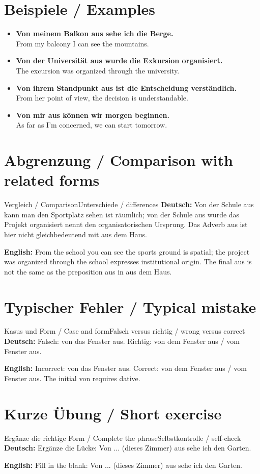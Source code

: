\documentclass[a4paper,11pt]{article}
\newcommand{\GermanText}[1]{\textbf{Deutsch: }#1\par}
\newcommand{\EnglishText}[1]{{\small\color{SoftGray}\textbf{English: }#1\par}}
\newcommand{\ExampleItem}[2]{\item \textbf{#1}\\{\small\color{SoftGray}#2}}
\begin{document}
\section{Beispiele / Examples}
\begin{exbox}
\begin{itemize}
\ExampleItem{Von meinem Balkon aus sehe ich die Berge.}{From my balcony I can see the mountains.}
\ExampleItem{Von der Universität aus wurde die Exkursion organisiert.}{The excursion was organized through the university.}
\ExampleItem{Von ihrem Standpunkt aus ist die Entscheidung verständlich.}{From her point of view, the decision is understandable.}
\ExampleItem{Von mir aus können wir morgen beginnen.}{As far as I'm concerned, we can start tomorrow.}
\end{itemize}
\end{exbox}
\section{Abgrenzung / Comparison with related forms}
\begin{grammarentry}{Vergleich / Comparison}{Unterschiede / differences}
\GermanText{Von der Schule aus kann man den Sportplatz sehen ist räumlich; von der Schule aus wurde das Projekt organisiert nennt den organisatorischen Ursprung. Das Adverb aus ist hier nicht gleichbedeutend mit aus dem Haus.}
\EnglishText{From the school you can see the sports ground is spatial; the project was organized through the school expresses institutional origin. The final aus is not the same as the preposition aus in aus dem Haus.}
\end{grammarentry}
\section{Typischer Fehler / Typical mistake}
\begin{grammarentry}{Kasus und Form / Case and form}{Falsch versus richtig / wrong versus correct}
\GermanText{Falsch: von das Fenster aus. Richtig: von dem Fenster aus / vom Fenster aus.}
\EnglishText{Incorrect: von das Fenster aus. Correct: von dem Fenster aus / vom Fenster aus. The initial von requires dative.}
\end{grammarentry}
\section{Kurze Übung / Short exercise}
\begin{grammarentry}{Ergänze die richtige Form / Complete the phrase}{Selbstkontrolle / self-check}
\GermanText{Ergänze die Lücke: Von ... (dieses Zimmer) aus sehe ich den Garten.}
\EnglishText{Fill in the blank: Von ... (dieses Zimmer) aus sehe ich den Garten.}
\end{grammarentry}
\end{document}
